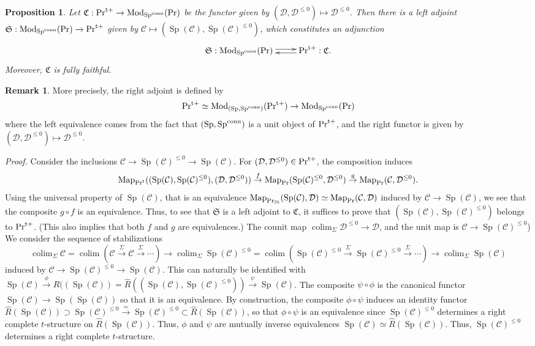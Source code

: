 \documentclass[leqno,12pt]{amsart}
\theoremstyle{plain}
\newtheorem{Proposition}[Theorem]{Proposition}
\theoremstyle{definition}
\newtheorem{Remark}[Theorem]{Remark}
\newcommand{\DDD}{\mathcal{D}}
\newcommand{\CCC}{\mathcal{C}}
\newcommand{\PR}{\textup{Pr}}
\newcommand{\PRT}{\textup{Pr}^{\textup{t}}}
\newcommand{\PRTT}{\textup{Pr}^{\textup{t}+}}
\newcommand{\SP}{\operatorname{Sp}}
\newcommand{\SPC}{\operatorname{Sp}^{\textup{conn}}}
\newcommand{\Mod}{\operatorname{Mod}}
\newcommand{\colim}{\operatorname{colim}}
\newcommand{\Map}{\operatorname{Map}}
\newcommand{\PRST}{\PR_{\textup{St}}}
\newcommand{\Proof}{{\sl Proof.}\quad}
\begin{document}
\begin{Proposition}
\label{prttadjoint}
Let $\mathfrak{C}:\PRTT\to \Mod_{\SPC}(\PR)$ be the functor given by $(\DDD,\DDD^{\le0})\mapsto \DDD^{\le0}$.
Then there is a left adjoint $\mathfrak{S}:\Mod_{\SPC}(\PR)\to \PRTT$ given by $\CCC \mapsto (\SP(\CCC),\SP(\CCC)^{\le0})$,
which constitutes an adjunction
\[
\xymatrix{
\mathfrak{S}:\Mod_{\SPC}(\PR)  \ar@<0.5ex>[r] &   \PRTT :\mathfrak{C}.  \ar@<0.5ex>[l]   \\
}
\]
Moreover,  $\mathfrak{C}$ is fully faithful.
\end{Proposition}

\begin{Remark}
More precisely, the right adjoint is defined by
\[
\PRTT\simeq \Mod_{(\SP,\SPC)}(\PRTT) \to \Mod_{\SPC}(\PR)
\]
where the left equivalence comes from the fact that $(\SP,\SPC)$ is a unit object of $\PRTT$, and the right functor 
is given by $(\DDD,\DDD^{\le0})\mapsto \DDD^{\le0}$.
\end{Remark}

\Proof
Consider the inclusions $\CCC\to \SP(\CCC)^{\le0}\to \SP(\CCC)$.
For $(\DDD,\DDD^{\le0})\in \PRTT$, the composition induces
\[
\Map_{\PRT}((\SP(\CCC),\SP(\CCC)^{\le0}),(\DDD,\DDD^{\le0})) \stackrel{f}{\to} \Map_{\PR}(\SP(\CCC)^{\le0},\DDD^{\le0}) \stackrel{g}{\to} \Map_{\PR}(\CCC,\DDD^{\le0}).
\]
Using the universal property of $\SP(\CCC)$, that is an equivalence 
$\Map_{\PRST}(\SP(\CCC),\DDD)\simeq \Map_{\PR}(\CCC, \DDD)$ induced by $\CCC\to \SP(\CCC)$,
we see that the composite $g\circ f$ is an equivalence.
Thus, to see that $\mathfrak{S}$ is a left adjoint to $\mathfrak{C}$,
it suffices to prove that $(\SP(\CCC),\SP(\CCC)^{\le0})$ belongs to $\PRTT$.
(This also implies that both $f$ and $g$ are equivalences.) The counit map $\colim_{\Sigma}\DDD^{\le0}\to \DDD$, and the unit map is $\CCC\to \SP(\CCC)^{\le0}$)
We consider the sequence of stabilizations 
\[
\colim_{\Sigma}\CCC=\colim(\CCC\stackrel{\Sigma}{\to}\CCC \stackrel{\Sigma}{\to}\cdots )\to \colim_{\Sigma}\SP(\CCC)^{\le0}=\colim(\SP(\CCC)^{\le0} \stackrel{\Sigma}{\to} \SP(\CCC)^{\le0}\stackrel{\Sigma}{\to}\cdots ) \to \colim_{\Sigma}\SP(\CCC)
\]
induced by $\CCC\to \SP(\CCC)^{\le0}\to \SP(\CCC)$.
This can naturally be identified with $\SP(\CCC)\stackrel{\phi}{\to} \widehat{R}((\SP(\CCC))=\widehat{R}((\SP(\CCC),\SP(\CCC)^{\le0})) \stackrel{\psi}{\to} \SP(\CCC)$.
The composite $\psi\circ\phi$ is the canonical functor $\SP(\CCC)\to \SP(\SP(\CCC))$ so that it is an equivalence.
By construction, the composite $\phi\circ \psi$ induces an identity functor $\widehat{R}(\SP(\CCC))\supset \SP(\CCC)^{\le0}\stackrel{\simeq}{\to} \SP(\CCC)^{\le0}\subset \widehat{R}(\SP(\CCC))$,
so that $\phi\circ \psi$ is an equivalence since $\SP(\CCC)^{\le0}$ determines a right complete $t$-structure on 
$\widehat{R}(\SP(\CCC))$. Thus, $\phi$ and $\psi$ are mutually inverse equivalences $\SP(\CCC)\simeq \widehat{R}(\SP(\CCC))$.
Thus, $\SP(\CCC)^{\le0}$ determines a right complete $t$-structure.
\end{document}
